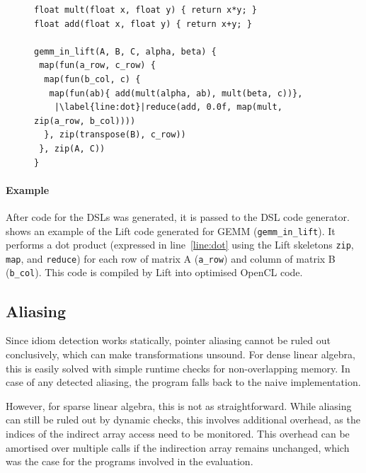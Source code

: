 \begin{figure}[H]
\begin{lstlisting}[language=LIFT,escapechar=|,
                   label={fig:liftmxm},caption=
   {GEMM in Lift is expressed with the higher-order functions
    ``{\tt zip}'', ``{\tt map}'', ``{\tt reduce}''.\leftskip=0pt\rightskip=0pt}]
float mult(float x, float y) { return x*y; }
float add(float x, float y) { return x+y; }

gemm_in_lift(A, B, C, alpha, beta) {
 map(fun(a_row, c_row) {
  map(fun(b_col, c) {
   map(fun(ab){ add(mult(alpha, ab), mult(beta, c))},
    |\label{line:dot}|reduce(add, 0.0f, map(mult, zip(a_row, b_col))))
  }, zip(transpose(B), c_row))
 }, zip(A, C))
}
\end{lstlisting}
\end{figure}

    \paragraph*{Example}
    After code for the DSLs was generated, it is passed to the DSL code
    generator.
     shows an example of the Lift code generated for GEMM
    ({\tt gemm\_in\_lift}).
    It performs a dot product (expressed in line~\ref{line:dot} using the Lift
    skeletons {\tt zip}, {\tt map}, and {\tt reduce}) for each row of
    matrix A ({\tt a\_row}) and column of matrix B ({\tt b\_col}).
    This code is compiled by Lift into optimised OpenCL code.

\subsection{Aliasing}

    Since idiom detection works statically, pointer aliasing cannot be ruled out
    conclusively, which can make transformations unsound.
    For dense linear algebra, this is easily solved with simple runtime
    checks for non-overlapping memory.
    In case of any detected aliasing, the program falls back to the naive
    implementation.

    However, for sparse linear algebra, this is not as straightforward.
    While aliasing can still be ruled out by dynamic checks, this involves
    additional overhead, as the indices of the indirect array access need to
    be monitored.
    This overhead can be amortised over multiple calls if the indirection array
    remains unchanged, which was the case for the programs involved in the
    evaluation.

